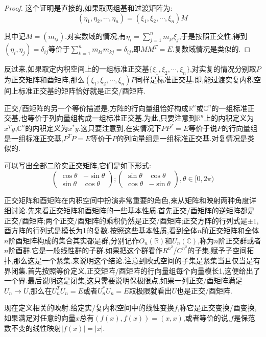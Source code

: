 \begin{proof}
	
	这个证明是直接的,如果取两组基和过渡矩阵为:
	$$(\eta_1,\eta_2,\cdots,\eta_n)=(\xi_1,\xi_2,\cdots,\xi_n)M$$
	
	其中记$M=(m_{ij})$.对实数域的情况,有$\eta_i=\sum_{j=1}^{n}m_{ji}\xi_j$,于是按照正交性,得到$(\eta_i,\eta_j)=\delta_{ij}$等价于$\sum_{k=1}^{n}m_{ki}m_{kj}=\delta_{ij}$,即$MM^T=E$.复数域情况是类似的.
	
\end{proof}

反过来,如果取定内积空间上的一组标准正交基$\{\xi_1,\xi_2,\cdots,\xi_n\}$,对实复的情况分别取$P$为正交矩阵和酉矩阵,那么$(\xi_1,\xi_2,\cdots,\xi_n)P$同样是标准正交基.即,能过渡实复内积空间上标准正交基的矩阵恰好就是正交/酉矩阵.

正交/酉矩阵的另一个等价描述是,方阵的行向量组恰好构成$\mathbb{R}^n$或$\mathbb{C}^n$的一组标准正交基,也等价于列向量组构成一组标准正交基.为此,只要注意到$\mathbb{R}^n$上的内积定义为$x^Ty$,$\mathbb{C}^n$的内积定义为$x^*y$.这只要注意到,在实情况下$PP^T=E$等价于说$P$的行向量组是一组标准正交基,$P^TP=E$等价于$P$的列向量组是一组标准正交基.对复情况是类似的.

可以写出全部二阶实正交矩阵,它们是如下形式:
$$\left(\begin{array}{cc}
\cos\theta&-\sin\theta\\
\sin\theta&\cos\theta\end{array}\right);\left(\begin{array}{cc}
\sin\theta&\cos\theta\\
\cos\theta&-\sin\theta\end{array}\right),\theta\in[0,2\pi)$$

正交矩阵和酉矩阵在内积空间中扮演非常重要的角色,来从矩阵和映射两种角度详细讨论.先来看正交矩阵和酉矩阵的一些基本性质.首先正交/酉矩阵的逆矩阵都是正交/酉矩阵;两个正交/酉矩阵的乘积仍然是正交/酉矩阵;正交方阵的行列式是$\pm1$,酉方阵的行列式是模长为1的复数.按照这些基本性质,看到全体$n$阶正交矩阵和全体$n$阶酉矩阵构成的集合其实都是群,分别记作$O_n(\mathbb{R})$和$U_n(\mathbb{C})$,称为$n$阶正交群或者$n$阶酉群.它是一般线性群的子群.如果把这个群看作$R^{n^2}$/$C^{n^2}$的子集,赋予子空间拓扑,那么这是一个紧集.来说明这个结论.注意到欧式空间的子集是紧集当且仅当是有界闭集.首先按照等价定义,正交矩阵/酉矩阵的行向量组每个向量模长1,这便给出了一个界.最后说明这是闭集,这只需要说明保极限点,如果一列正交/酉矩阵满足$U_n\to U$,那么在$U_n^TU_n=E$或者$U_n^*U_n=E$取极限就看出$U$也是正交/酉矩阵.

现在定义相关的映射.给定实/复内积空间中的线性变换$f$,称它是正交变换/酉变换,如果满足对任意的向量$x$总有$(f(x),f(x))=(x,x)$,或者等价的说,$f$是保范数不变的线性映射$|f(x)|=|x|$.

